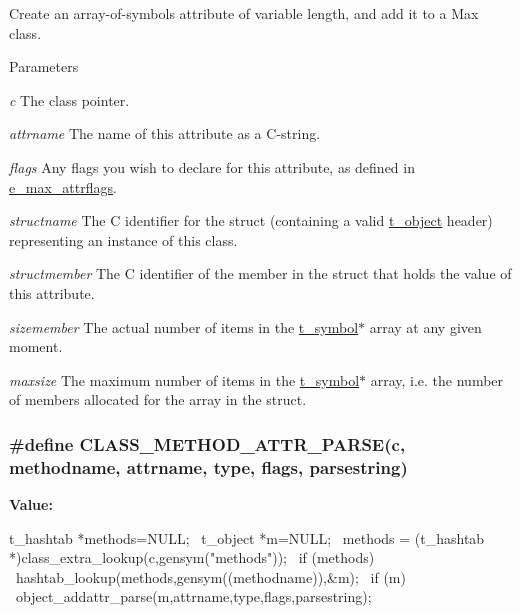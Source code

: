 Create an array-\/of-\/symbols attribute of variable length, and add it to a Max class. 
\begin{DoxyParams}{Parameters}
\item[{\em c}]The class pointer. \item[{\em attrname}]The name of this attribute as a C-\/string. \item[{\em flags}]Any flags you wish to declare for this attribute, as defined in \hyperlink{group__attr_gaf296cfc6741bb19207f6ed8062809115}{e\_\-max\_\-attrflags}. \item[{\em structname}]The C identifier for the struct (containing a valid \hyperlink{structt__object}{t\_\-object} header) representing an instance of this class. \item[{\em structmember}]The C identifier of the member in the struct that holds the value of this attribute. \item[{\em sizemember}]The actual number of items in the \hyperlink{structt__symbol}{t\_\-symbol}$\ast$ array at any given moment. \item[{\em maxsize}]The maximum number of items in the \hyperlink{structt__symbol}{t\_\-symbol}$\ast$ array, i.e. the number of members allocated for the array in the struct. \end{DoxyParams}
\hypertarget{group__attr_ga389ea581eb9aece1a2c159bf1480a138}{
\subsubsection[{CLASS\_\-METHOD\_\-ATTR\_\-PARSE}]{\setlength{\rightskip}{0pt plus 5cm}\#define CLASS\_\-METHOD\_\-ATTR\_\-PARSE(c, \/  methodname, \/  attrname, \/  type, \/  flags, \/  parsestring)}}
\label{group__attr_ga389ea581eb9aece1a2c159bf1480a138}
{\bfseries Value:}
\begin{DoxyCode}
{   t_hashtab *methods=NULL; \
        t_object *m=NULL; \
        methods = (t_hashtab *)class_extra_lookup(c,gensym("methods")); \
        if (methods) { \
            hashtab_lookup(methods,gensym((methodname)),&m); \
            if (m) \
                object_addattr_parse(m,attrname,type,flags,parsestring); \
        } \
    }
\end{DoxyCode}


